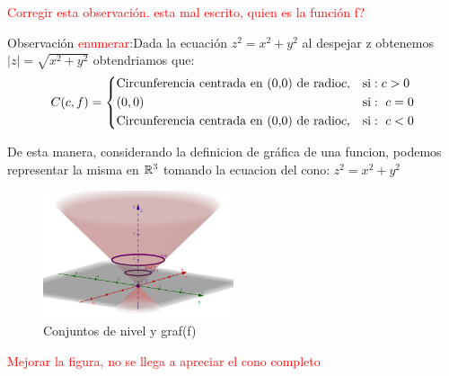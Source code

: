 \begin{definition} 
\textcolor{red}{Corregir esta observaci\'on. esta mal escrito, quien es la funci\'on f?}


Observaci\'on \textcolor{red}{enumerar}:Dada la  ecuaci\'on $z^2=x^2+y^2$ al despejar z obtenemos $|z|=\sqrt{x^2+y^2}$ obtendriamos que: 
 \[
        C(c,f)=
        \begin{dcases}
           \textnormal{Circunferencia centrada en (0,0) de radio} c,  & \textnormal{si}:  c>0 \\
(0,0)  & \textnormal{si}:\ c=0\\
\textnormal{Circunferencia centrada en (0,0) de radio} c,  & \textnormal{si}:\ c<0\\
        \end{dcases}
    \]

De esta manera, considerando la definicion de gráfica de una funcion, podemos representar la misma en $\mathbb{R}^3$ tomando  la ecuacion del cono: $z^2=x^2+y^2$

\begin{figure}[h!] %
    \centering
    \includegraphics[width=0.5\textwidth]{../figs/conjunto3_r3.png} %
    \caption{Conjuntos de nivel y graf(f)}
    \label{fig:ejemplo} %
\end{figure}


\textcolor{red}{Mejorar la figura, no se llega a apreciar el cono completo}

\end{definition}
